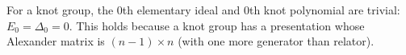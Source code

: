 For a knot group, the 0th elementary ideal and 0th knot polynomial are trivial: $E_0 = \Delta_0 = 0$. This holds because a knot group has a presentation whose Alexander matrix is $(n-1) \times n$ (with one more generator than relator).
